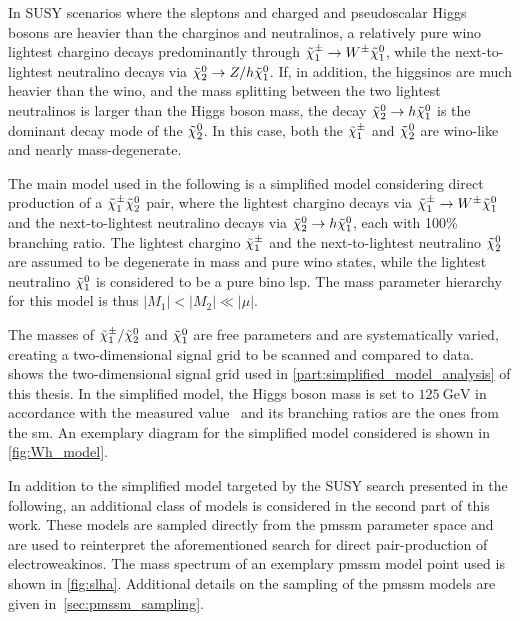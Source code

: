 
In SUSY scenarios where the sleptons and charged and pseudoscalar Higgs bosons are heavier than the charginos and neutralinos, a relatively pure wino lightest chargino decays predominantly through $\tilde{\chi}_1^\pm\rightarrow W^\pm\tilde{\chi}_1^0$, while the next-to-lightest neutralino decays via $\tilde{\chi}_2^0\rightarrow Z/h\tilde{\chi}_1^0$. If, in addition, the higgsinos are much heavier than the wino, and the mass splitting between the two lightest neutralinos is larger than the Higgs boson mass, the decay $\tilde{\chi}_2^0\rightarrow h\tilde{\chi}_1^0$ is the dominant decay mode of the $\tilde{\chi}_2^0$. In this case, both the $\tilde{\chi}_1^\pm$ and $\tilde{\chi}_2^0$ are wino-like and nearly mass-degenerate.

The main model used in the following is a simplified model considering direct production of a $\tilde{\chi}_1^\pm\tilde{\chi}_2^0$ pair, where the lightest chargino decays via $\tilde{\chi}_1^\pm\rightarrow W^\pm\tilde{\chi}_1^0$ and the next-to-lightest neutralino decays via $\tilde{\chi}_2^0\rightarrow h\tilde{\chi}_1^0$, each with 100\% branching ratio.
The lightest chargino $\tilde{\chi}_1^\pm$ and the next-to-lightest neutralino $\tilde{\chi}_2^0$ are assumed to be degenerate in mass and pure wino states, while the lightest neutralino $\tilde{\chi}_1^0$ is considered to be a pure bino \gls{lsp}.
The mass parameter hierarchy for this model is thus $\vert M_1 \vert < \vert M_2 \vert \ll \vert\mu\vert$. 

The masses of $\tilde{\chi}_1^\pm/\tilde{\chi}_2^0$ and $\tilde{\chi}_1^0$ are free parameters and are systematically varied, creating a two-dimensional signal grid to be scanned and compared to data.  shows the two-dimensional signal grid used in \cref{part:simplified_model_analysis} of this thesis. In the simplified model, the Higgs boson mass is set to $\SI{125}{\GeV}$ in accordance with the measured value~\cite{Aad:2012tfa,Chatrchyan:2012ufa} and its branching ratios are the ones from the \gls{sm}. An exemplary diagram for the simplified model considered is shown in \cref{fig:Wh_model}.

In addition to the simplified model targeted by the SUSY search presented in the following, an additional class of models is considered in the second part of this work. These models are sampled directly from the \gls{pmssm} parameter space and are used to reinterpret the aforementioned search for direct pair-production of electroweakinos. The mass spectrum of an exemplary \gls{pmssm} model point used is shown in \cref{fig:slha}. Additional details on the sampling of the \gls{pmssm} models are given in~\cref{sec:pmssm_sampling}. 


